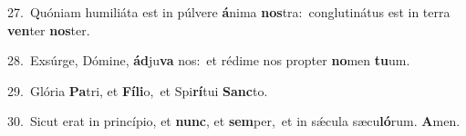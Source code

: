 {\numbfont\textcolor{\numbcolor}{27.}}~Quóniam humiliáta est in púlvere \textbf{á}\-nima \textbf{nos}\-tra:~\star conglutinátus est in terra \textbf{ven}\-ter \textbf{nos}\-ter.\par
{\numbfont\textcolor{\numbcolor}{28.}}~Exsúrge, Dómine, \textbf{ád}\-ju\textbf{va} nos:~\star et rédime nos propter \textbf{no}\-men \textbf{tu}\-um.\par
{\numbfont\textcolor{\numbcolor}{29.}}~Glória \textbf{Pa}\-tri, et \textbf{Fí}\-\textbf{li}o,~\star et Spi\-\textbf{rí}\-tui \textbf{Sanc}\-to.\par
{\numbfont\textcolor{\numbcolor}{30.}}~Sicut erat in princípio, et \textbf{nunc}\-, et \textbf{sem}\-per,~\star et in sǽcula sæcu\-\textbf{ló}\-rum. \textbf{A}\-men.\par
